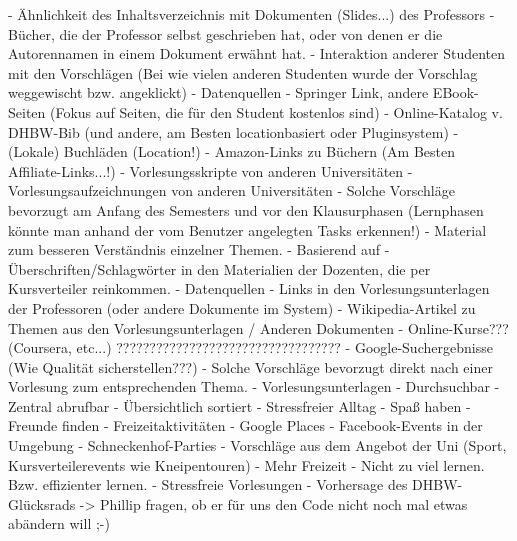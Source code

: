                             - Ähnlichkeit des Inhaltsverzeichnis mit Dokumenten (Slides...) des Professors
                            - Bücher, die der Professor selbst geschrieben hat, oder von denen er die Autorennamen in einem Dokument erwähnt hat.
                            - Interaktion anderer Studenten mit den Vorschlägen (Bei wie vielen anderen Studenten wurde der Vorschlag weggewischt bzw. angeklickt)
                        - Datenquellen
                            - Springer Link, andere EBook-Seiten (Fokus auf Seiten, die für den Student kostenlos sind)
                            - Online-Katalog v. DHBW-Bib (und andere, am Besten locationbasiert oder Pluginsystem)
                            - (Lokale) Buchläden (Location!)
                            - Amazon-Links zu Büchern (Am Besten Affiliate-Links...!)
                            - Vorlesungsskripte von anderen Universitäten
                            - Vorlesungsaufzeichnungen von anderen Universitäten
                        - Solche Vorschläge bevorzugt am Anfang des Semesters und vor den Klausurphasen (Lernphasen könnte man anhand der vom Benutzer angelegten Tasks erkennen!)
                - Material zum besseren Verständnis einzelner Themen.
                    - Basierend auf
                        - Überschriften/Schlagwörter in den Materialien der Dozenten, die per Kursverteiler reinkommen.
                    - Datenquellen
                        - Links in den Vorlesungsunterlagen der Professoren (oder andere Dokumente im System)
                        - Wikipedia-Artikel zu Themen aus den Vorlesungsunterlagen / Anderen Dokumenten
                        - Online-Kurse??? (Coursera, etc...) ??????????????????????????????????
                        - Google-Suchergebnisse (Wie Qualität sicherstellen???)
                    - Solche Vorschläge bevorzugt direkt nach einer Vorlesung zum entsprechenden Thema.
                - Vorlesungsunterlagen
                    - Durchsuchbar
                    - Zentral abrufbar
                    - Übersichtlich sortiert
    - Stressfreier Alltag
        - Spaß haben
            - Freunde finden
            - Freizeitaktivitäten
                - Google Places
                - Facebook-Events in der Umgebung
                - Schneckenhof-Parties
                - Vorschläge aus dem Angebot der Uni (Sport, Kursverteilerevents wie Kneipentouren)
            - Mehr Freizeit
                - Nicht zu viel lernen. Bzw. effizienter lernen.
        - Stressfreie Vorlesungen
            - Vorhersage des DHBW-Glücksrads
                -> Phillip fragen, ob er für uns den Code nicht noch mal etwas abändern will ;-)
